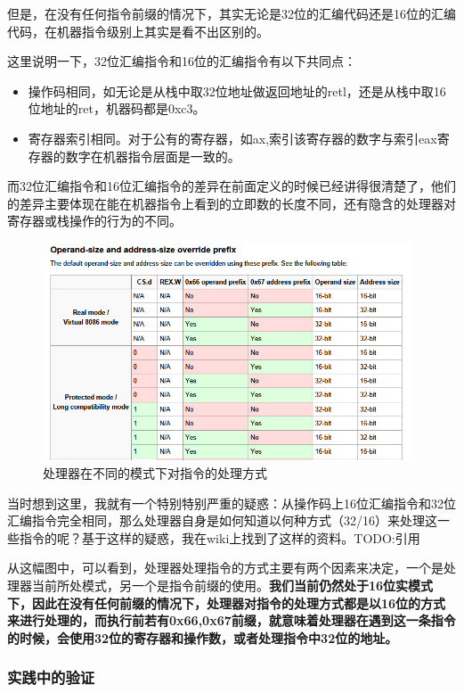 \documentclass[forprint]{WHUBachelor}
\begin{document}
但是，在没有任何指令前缀的情况下，其实无论是32位的汇编代码还是16位的汇编代码，在机器指令级别上其实是看不出区别的。

这里说明一下，32位汇编指令和16位的汇编指令有以下共同点：

\begin{itemize}
  \item 操作码相同，如无论是从栈中取32位地址做返回地址的retl，还是从栈中取16位地址的ret，机器码都是0xc3。
  \item 寄存器索引相同。对于公有的寄存器，如ax,索引该寄存器的数字与索引eax寄存器的数字在机器指令层面是一致的。
\end{itemize} 

而32位汇编指令和16位汇编指令的差异在前面定义的时候已经讲得很清楚了，他们的差异主要体现在能在机器指令上看到的立即数的长度不同，还有隐含的处理器对寄存器或栈操作的行为的不同。


\begin{figure}[htp]
  \centering
  \includegraphics[width=11cm]{"./figure/wiki_prefix.png"}
  \caption{处理器在不同的模式下对指令的处理方式}
  \label{fig:wiki-prefix}
\end{figure}

当时想到这里，我就有一个特别特别严重的疑惑：从操作码上16位汇编指令和32位汇编指令完全相同，那么处理器自身是如何知道以何种方式（32/16）来处理这一些指令的呢？基于这样的疑惑，我在wiki上找到了这样的资料。TODO:引用


从这幅图中，可以看到，处理器处理指令的方式主要有两个因素来决定，一个是处理器当前所处模式，另一个是指令前缀的使用。\textbf{我们当前仍然处于16位实模式下，因此在没有任何前缀的情况下，处理器对指令的处理方式都是以16位的方式来进行处理的，而执行前若有0x66,0x67前缀，就意味着处理器在遇到这一条指令的时候，会使用32位的寄存器和操作数，或者处理指令中32位的地址。}

\subsubsection{实践中的验证}
\end{document}
